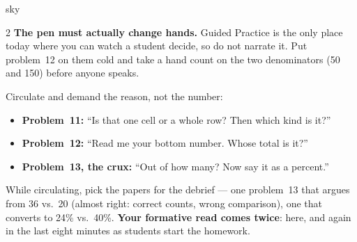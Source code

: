 \documentclass[10pt]{article}
\begin{document}
\begin{skillbox}{sky}
\begin{multicols}{2}
\textbf{The pen must actually change hands.} Guided Practice is the only place today where you
can watch a student decide, so do not narrate it. Put problem~12 on them cold and take a hand
count on the two denominators (50 and 150) before anyone speaks.

Circulate and demand the reason, not the number:
\begin{itemize}[leftmargin=1.1em, nosep]
  \item \textbf{Problem~11:} ``Is that one cell or a whole row? Then which kind is it?''
  \item \textbf{Problem~12:} ``Read me your bottom number. Whose total is it?''
  \item \textbf{Problem~13, the crux:} ``Out of how many? Now say it as a percent.''
\end{itemize}
While circulating, pick the papers for the debrief --- one problem~13 that argues from 36 vs.\
20 (almost right: correct counts, wrong comparison), one that converts to 24\% vs.\ 40\%.
\textbf{Your formative read comes twice}: here, and again in the last eight minutes as students
start the homework.
\end{multicols}
\end{skillbox}
\end{document}
